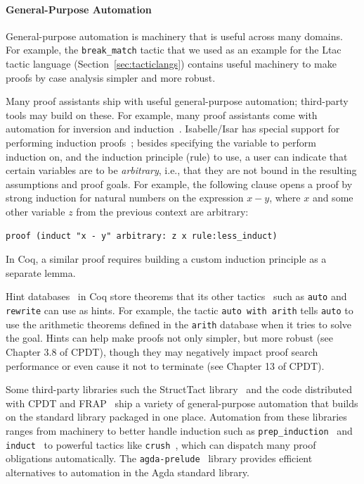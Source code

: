 \paragraph{General-Purpose Automation} 
General-purpose automation is machinery that is useful across many domains.
For example, the \lstinline{break_match} tactic that we used as an example for the Ltac tactic language (Section~\ref{sec:tacticlangs})
contains useful machinery to make proofs by case analysis simpler and more robust.

Many proof assistants ship with useful general-purpose automation;
third-party tools may build on these.
For example, many proof assistants come with automation for inversion and induction~\citep{nipkow1989term, mcbride1996inverting, cornes1995automating}. %
Isabelle/Isar has special support for performing induction proofs~\citep{Wenzel2006}; besides specifying the variable to perform induction on, and the induction principle (rule) to use, a user can indicate that certain variables are to be \emph{arbitrary}, i.e., that they are not bound in the resulting assumptions and proof goals.
%
For example, the following clause opens a proof by strong induction for natural numbers on the expression $x - y$, where $x$ and some other variable $z$ from the previous context are arbitrary:
\begin{lstlisting}
proof (induct "x - y" arbitrary: z x rule:less_induct)
\end{lstlisting}
%
In Coq, a similar proof requires building a custom induction principle as a separate lemma.

Hint databases~\citep{coq-commands} in Coq store theorems 
that its other tactics~\citep{coq-tactics} such as \lstinline{auto} and \lstinline{rewrite} can use as hints.
For example, the tactic \lstinline{auto with arith} tells \lstinline{auto} to use the arithmetic theorems
defined in the \lstinline{arith} database when it tries to solve the goal. Hints can help make proofs not only
simpler, but more robust (see Chapter 3.8 of CPDT), though they may negatively impact proof search performance
or even cause it not to terminate (see Chapter 13 of CPDT). 

Some third-party libraries such the StructTact library~\citep{structtact}
and the code distributed with CPDT and FRAP~\citep{FRAPBook} ship a variety of general-purpose automation
that builds on the standard library packaged in one place.
Automation from these libraries ranges from machinery to better handle induction such as \lstinline{prep_induction}~\citep{structtact}
and \lstinline{induct}~\citep{FRAPBook} to powerful tactics like \lstinline{crush}~\citep{CPDT}, which can dispatch many proof obligations
automatically. The \lstinline{agda-prelude}~\citep{agda-prelude} library provides efficient alternatives 
to automation in the Agda standard library.


